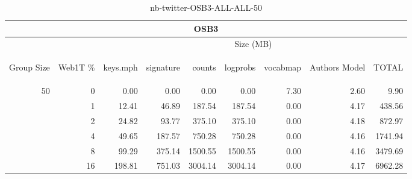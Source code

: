 \begin{center}
\begin{table}[htbp] 
 \begin{center}
\begin{tabular}{ | r | r | r | r | r | r | r | r | r |}
\hline
\multicolumn{9}{|c|}{OSB3}\\
\hline
 & & \multicolumn{7}{|c|}{Size (MB)}\\ \cline{3-9}
\begin{sideways}Group Size\end{sideways} & \begin{sideways}Web1T \% \end{sideways} & \begin{sideways}keys.mph\end{sideways} & \begin{sideways}signature\end{sideways} & \begin{sideways}counts\end{sideways} & \begin{sideways}logprobs\end{sideways} & \begin{sideways}vocabmap\end{sideways} & \begin{sideways}Authors Model \end{sideways} & \begin{sideways}TOTAL\end{sideways}\\
\hline
\multirow{5}{*}{50}
 & 0 & 0.00 & 0.00 & 0.00 & 0.00 & 7.30 & 2.60 & 9.90\\ \cline{2-9}
 & 1 & 12.41 & 46.89 & 187.54 & 187.54 & 0.00 & 4.17 & 438.56\\ \cline{2-9}
 & 2 & 24.82 & 93.77 & 375.10 & 375.10 & 0.00 & 4.18 & 872.97\\ \cline{2-9}
 & 4 & 49.65 & 187.57 & 750.28 & 750.28 & 0.00 & 4.16 & 1741.94\\ \cline{2-9}
 & 8 & 99.29 & 375.14 & 1500.55 & 1500.55 & 0.00 & 4.16 & 3479.69\\ \cline{2-9}
 & 16 & 198.81 & 751.03 & 3004.14 & 3004.14 & 0.00 & 4.17 & 6962.28\\ \cline{2-9}
\hline
\end{tabular}
\caption{nb-twitter-OSB3-ALL-ALL-50}
\label{table:nb-twitter-OSB3-ALL-ALL-50}
\end{center}
 \end{table}
\end{center}

